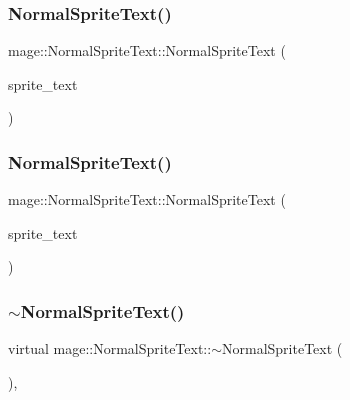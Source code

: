 \subsubsection{\texorpdfstring{Normal\+Sprite\+Text()}{NormalSpriteText()}\hspace{0.1cm}{\footnotesize\ttfamily [2/3]}}
{\footnotesize\ttfamily mage\+::\+Normal\+Sprite\+Text\+::\+Normal\+Sprite\+Text (\begin{DoxyParamCaption}\item[{const \hyperlink{classmage_1_1_normal_sprite_text}{Normal\+Sprite\+Text} \&}]{sprite\+\_\+text }\end{DoxyParamCaption})\hspace{0.3cm}{\ttfamily [default]}}

\hypertarget{classmage_1_1_normal_sprite_text_ae16d982e1d959b6b80f82610b07ec15b}{}\label{classmage_1_1_normal_sprite_text_ae16d982e1d959b6b80f82610b07ec15b} 
\subsubsection{\texorpdfstring{Normal\+Sprite\+Text()}{NormalSpriteText()}\hspace{0.1cm}{\footnotesize\ttfamily [3/3]}}
{\footnotesize\ttfamily mage\+::\+Normal\+Sprite\+Text\+::\+Normal\+Sprite\+Text (\begin{DoxyParamCaption}\item[{\hyperlink{classmage_1_1_normal_sprite_text}{Normal\+Sprite\+Text} \&\&}]{sprite\+\_\+text }\end{DoxyParamCaption})\hspace{0.3cm}{\ttfamily [default]}}

\hypertarget{classmage_1_1_normal_sprite_text_a5ead5607cb41849419827ff231b4ea9d}{}\label{classmage_1_1_normal_sprite_text_a5ead5607cb41849419827ff231b4ea9d} 
\subsubsection{\texorpdfstring{$\sim$\+Normal\+Sprite\+Text()}{~NormalSpriteText()}}
{\footnotesize\ttfamily virtual mage\+::\+Normal\+Sprite\+Text\+::$\sim$\+Normal\+Sprite\+Text (\begin{DoxyParamCaption}{ }\end{DoxyParamCaption})\hspace{0.3cm}{\ttfamily [virtual]}, {\ttfamily [default]}}



